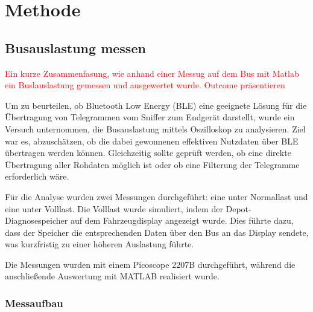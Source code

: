 



\chapter{Methode} %
\label{ChapterX} %


\section{Busauslastung messen}
\textcolor{red}{Ein kurze Zusammenfasung, wie anhand einer Messug auf dem Bus mit Matlab ein Buslauslastung gemessen und ausgewertet wurde. Outcome präsentieren}

Um zu beurteilen, ob Bluetooth Low Energy (BLE) eine geeignete Lösung für die Übertragung von Telegrammen vom Sniffer zum Endgerät darstellt, wurde ein Versuch unternommen, die Busauslastung mittels Oszilloskop zu analysieren. Ziel war es, abzuschätzen, ob die dabei gewonnenen effektiven Nutzdaten über BLE übertragen werden können. Gleichzeitig sollte geprüft werden, ob eine direkte Übertragung aller Rohdaten möglich ist oder ob eine Filterung der Telegramme erforderlich wäre.

Für die Analyse wurden zwei Messungen durchgeführt: eine unter Normallast und eine unter Volllast. Die Volllast wurde simuliert, indem der Depot-Diagnosespeicher auf dem Fahrzeugdisplay angezeigt wurde. Dies führte dazu, dass der Speicher die entsprechenden Daten über den Bus an das Display sendete, was kurzfristig zu einer höheren Auslastung führte.

Die Messungen wurden mit einem Picoscope 2207B durchgeführt, während die anschließende Auswertung mit MATLAB realisiert wurde.

\subsection{Messaufbau}

